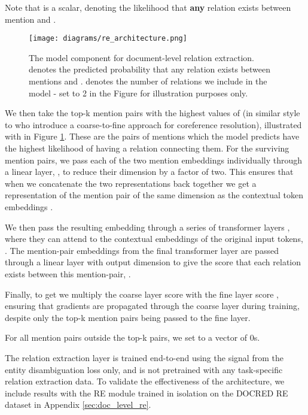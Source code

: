 \documentclass[11pt]{article}
\begin{document}
Note that  is a scalar, denoting the likelihood that \textbf{any} relation exists between mention  and .


\begin{figure}[h]
    \centering
    \texttt{[image: diagrams/re\_architecture.png]}
    \caption{The model component for document-level relation extraction.  denotes the predicted probability that any relation exists between mentions  and .  denotes the number of relations we include in the model - set to 2 in the Figure for illustration purposes only.}
    \label{re_architecture}
\end{figure}


We then take the top-k mention pairs with the highest values of  (in similar style to \citet{coarse2fine} who introduce a coarse-to-fine approach for coreference resolution), illustrated with  in Figure \ref{re_architecture}. These are the pairs of mentions which the model predicts have the highest likelihood of having a relation connecting them. For the surviving mention pairs, we pass each of the two mention embeddings individually through a linear layer, , to reduce their dimension by a factor of two. This ensures that when we concatenate the two representations back together we get a representation of the mention pair  of the same dimension as the contextual token embeddings .



We then pass the resulting embedding  through a series of transformer layers , where they can attend to the contextual embeddings of the original input tokens, . The mention-pair embeddings from the final transformer layer are passed through a linear layer  with output dimension  to give the score that each relation exists between this mention-pair, .





Finally, to get  we multiply the coarse layer score  with the fine layer score , ensuring that gradients are propagated through the coarse layer during training, despite only the top-k mention pairs being passed to the fine layer. 



For all mention pairs outside the top-k pairs, we set  to a vector of 0s. 

The relation extraction layer is trained end-to-end using the signal from the entity disambiguation loss only, and is not pretrained with any task-specific relation extraction data. To validate the effectiveness of the architecture, we include results with the RE module trained in isolation on the DOCRED RE dataset in Appendix \ref{sec:doc_level_re}.
\end{document}
